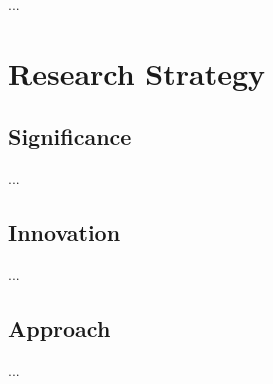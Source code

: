 \documentclass[11pt,notitlepage]{article}
\begin{document}
\blindtext
 ...

 \newpage

\section*{Research Strategy}

\subsection*{Significance}

\blindtext ...~\cite{reference1}

\subsection*{Innovation}

\blindtext ...

\subsection*{Approach}

\blindtext ...

\newpage



\end{document}
